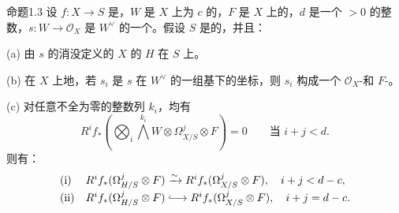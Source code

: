 \begin{SGAresult}{命题}{1.3}
设 $f:X\longrightarrow S$ 是，$W$ 是 $X$ 上为 $c$ 的，$F$ 是 $X$ 上的，$d$ 是一个 $>0$ 的整数，$s:W\longrightarrow\mathcal O_X$ 是 $W^\vee$ 的一个。假设 $S$ 是的，并且：

(a) 由 $s$ 的消没定义的 $X$ 的 $H$ 在 $S$ 上。

(b) 在 $X$ 上地，若 $s_i$ 是 $s$ 在 $W^\vee$ 的一组基下的坐标，则 $s_i$ 构成一个 $\mathcal O_X$-和 $F$-。

(c) 对任意不全为零的整数列 $k_i$，均有
\[
 R^if_*\left(\bigotimes_i\bigwedge^{k_i}W\otimes\Omega^j_{X/S}\otimes F\right)=0\qquad\text{当 }i+j<d.
\]
则有：
\[
\begin{array}{ll}
\text{(i)}&R^if_*(\Omega^j_{H/S}\otimes F)\xrightarrow{\sim}R^if_*(\Omega^j_{X/S}\otimes F),\quad i+j<d-c,\\[3pt]
\text{(ii)}&R^if_*(\Omega^j_{H/S}\otimes F)\lhook\joinrel\longrightarrow R^if_*(\Omega^j_{X/S}\otimes F),\quad i+j=d-c.
\end{array}
\]
\end{SGAresult}
